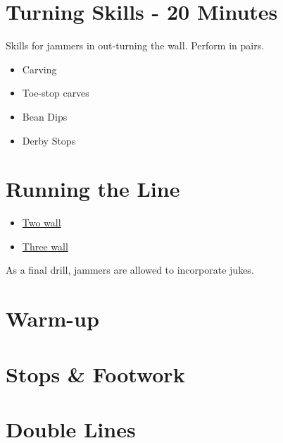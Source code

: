 \documentclass{journal}
\begin{document}
\section*{Turning Skills - 20 Minutes}
Skills for jammers in out-turning the wall.
Perform in pairs.

\begin{itemize}
\item Carving
\item Toe-stop carves
\item Bean Dips
\item Derby Stops 
\end{itemize}

\section*{Running the Line}

\begin{itemize}
\item \hyperref[drill:two_wall/double_lines]{Two wall}
\item \hyperref[drill:three_wall/double_lines]{Three wall}
\end{itemize}

As a final drill, jammers are allowed to incorporate jukes. 

\pagebreak
\section*{Warm-up}
\label{sec:warmup}


\section*{Stops \& Footwork}
\label{sec:footwork}





\section*{Double Lines}
\label{sec:double_lines}


\end{document}
